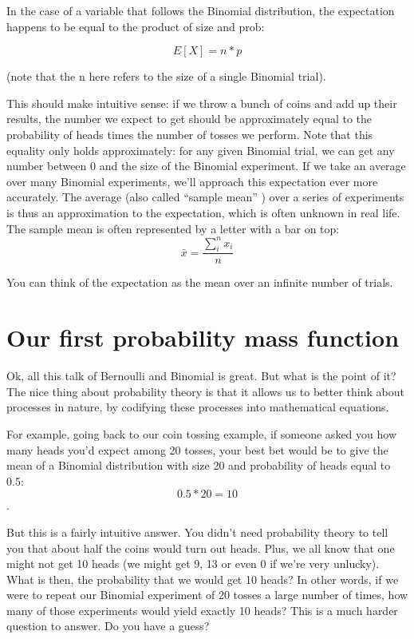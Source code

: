 \documentclass[
]{book}
\begin{document}
In the case of a variable that follows the Binomial distribution, the expectation happens to be equal to the product of size and prob:

\[E[X] = n * p\]

(note that the n here refers to the size of a single Binomial trial).

This should make intuitive sense: if we throw a bunch of coins and add up their results, the number we expect to get should be approximately equal to the probability of heads times the number of tosses we perform. Note that this equality only holds approximately: for any given Binomial trial, we can get any number between 0 and the size of the Binomial experiment. If we take an average over many Binomial experiments, we'll approach this expectation ever more accurately. The average (also called ``sample mean'' ) over a series of experiments is thus an approximation to the expectation, which is often unknown in real life. The sample mean is often represented by a letter with a bar on top: \[\bar{x} = \frac{\sum_{i}^{n}x_{i}}{n}\]

You can think of the expectation as the mean over an infinite number of trials.

\hypertarget{our-first-probability-mass-function}{%
\section{Our first probability mass function}\label{our-first-probability-mass-function}}

Ok, all this talk of Bernoulli and Binomial is great. But what is the point of it? The nice thing about probability theory is that it allows us to better think about processes in nature, by codifying these processes into mathematical equations.

For example, going back to our coin tossing example, if someone asked you how many heads you'd expect among 20 tosses, your best bet would be to give the mean of a Binomial distribution with size 20 and probability of heads equal to 0.5: \[0.5*20=10\].

But this is a fairly intuitive answer. You didn't need probability theory to tell you that about half the coins would turn out heads. Plus, we all know that one might not get 10 heads (we might get 9, 13 or even 0 if we're very unlucky). What is then, the probability that we would get 10 heads? In other words, if we were to repeat our Binomial experiment of 20 tosses a large number of times, how many of those experiments would yield exactly 10 heads? This is a much harder question to answer. Do you have a guess?
\end{document}
